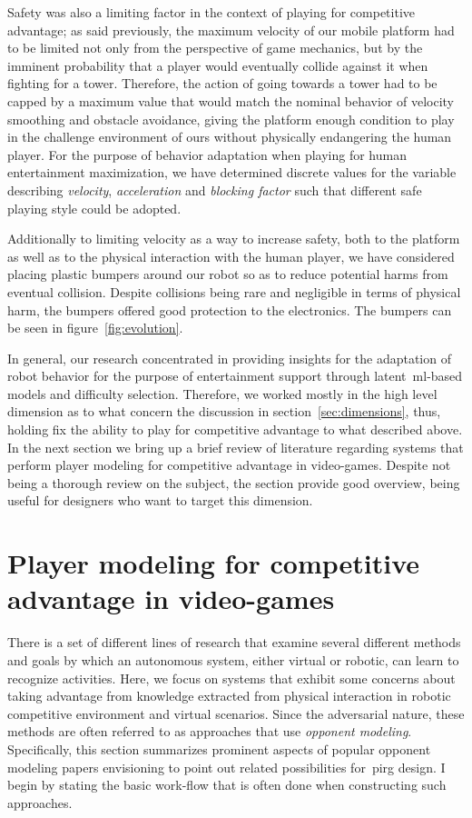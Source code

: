 Safety was also a limiting factor in the context of playing for competitive advantage; as said previously, the maximum velocity of our mobile platform had to be limited not only from the perspective of game mechanics, but by the imminent probability that a player would eventually collide against it when fighting for a tower. Therefore, the action of going towards a tower had to be capped by a maximum value that would match the nominal behavior of velocity smoothing and obstacle avoidance, giving the platform enough condition to play in the challenge environment of ours without physically endangering the human player.  For the purpose of behavior adaptation when playing for human entertainment maximization, we have determined discrete values for the variable describing \textit{velocity}, \textit{acceleration} and \textit{blocking factor} such that different safe playing style could be adopted.

Additionally to limiting velocity as a way to increase safety, both to the platform as well as to the physical interaction with the human player, we have considered placing plastic bumpers around our robot so as to reduce potential harms from eventual collision. Despite collisions being rare and negligible in terms of physical harm, the bumpers offered good protection to the electronics. The bumpers can be seen in figure~\ref{fig:evolution}. 

In general, our research concentrated in providing insights for the adaptation of robot behavior for the purpose of entertainment support through latent~\gls{ml}-based models and difficulty selection. Therefore, we worked mostly in the high level dimension as to what concern the discussion in section~\ref{sec:dimensions}, thus, holding fix the ability to play for competitive advantage to what described above. In the next section we bring up a brief review of literature regarding systems that perform player modeling for competitive advantage in video-games. Despite not being a thorough review on the subject, the section provide good overview, being useful for designers who want to target this dimension.

\section{Player modeling for competitive advantage in video-games}\label{compadvantage}
There is a set of different lines of research that examine several different methods and goals by which an autonomous system, either virtual or robotic, can learn to recognize activities. Here, we focus on systems that exhibit some concerns about taking advantage from knowledge extracted from physical interaction in robotic competitive environment and virtual scenarios. Since the adversarial nature, these methods are often referred to as approaches that use \textit{opponent modeling}.  Specifically, this section summarizes prominent aspects of popular opponent modeling papers envisioning to point out related possibilities for~\gls{pirg} design. I begin by stating the basic work-flow that is often done when constructing such approaches. 

